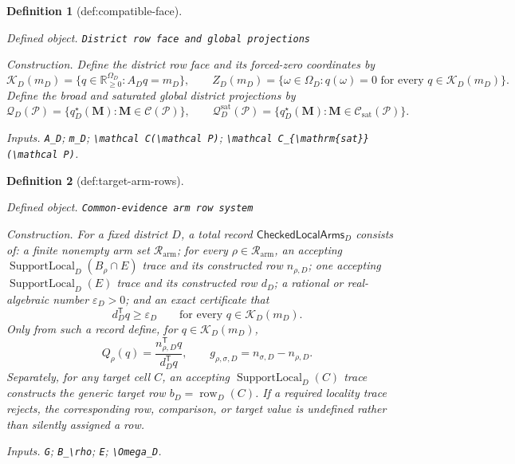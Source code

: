 \documentclass{article}
\newtheorem{definition}{Definition}
\begin{document}
\begin{definition}[def:compatible-face]\label{def:compatible-face}
\par\smallskip\noindent\emph{Defined object.} \texttt{District row face and global projections}
\par\smallskip\noindent\emph{Construction.} Define the district row face and its forced-zero coordinates by
\[
\mathcal K_D(m_D)=\{q\in\mathbb R_{\ge0}^{\Omega_D}:A_Dq=m_D\},
\qquad
Z_D(m_D)=\{\omega\in\Omega_D:q(\omega)=0\text{ for every }q\in\mathcal K_D(m_D)\}.
\]
Define the broad and saturated global district projections by
\[
\mathcal Q_D(\mathcal P)=\{q_D^\star(\mathbf M):\mathbf M\in\mathcal C(\mathcal P)\},
\qquad
\mathcal Q_D^{\mathrm{sat}}(\mathcal P)=\{q_D^\star(\mathbf M):\mathbf M\in\mathcal C_{\mathrm{sat}}(\mathcal P)\}.
\]
\par\smallskip\noindent\emph{Inputs.} \texttt{A\_\allowbreak{}D}; \texttt{m\_\allowbreak{}D}; \texttt{\textbackslash{}\allowbreak{}mathcal C(\textbackslash{}\allowbreak{}mathcal P)}; \texttt{\textbackslash{}\allowbreak{}mathcal C\_\allowbreak{}\{\textbackslash{}\allowbreak{}mathrm\{sat\}\allowbreak{}\}\allowbreak{}(\textbackslash{}\allowbreak{}mathcal P)}.
\end{definition}

\begin{definition}[def:target-arm-rows]\label{def:target-arm-rows}
\par\smallskip\noindent\emph{Defined object.} \texttt{Common-\allowbreak{}evidence arm row system}
\par\smallskip\noindent\emph{Construction.} For a fixed district \(D\), a total record \(\mathsf{CheckedLocalArms}_D\) consists of: a finite nonempty arm set \(\mathcal R_{\mathrm{arm}}\); for every \(\rho\in\mathcal R_{\mathrm{arm}}\), an accepting \(\operatorname{SupportLocal}_D(B_\rho\cap E)\) trace and its constructed row \(n_{\rho,D}\); one accepting \(\operatorname{SupportLocal}_D(E)\) trace and its constructed row \(d_D\); a rational or real-algebraic number \(\varepsilon_D>0\); and an exact certificate that
\[
d_D^{\mathsf T}q\geq\varepsilon_D
\qquad\text{for every }q\in\mathcal K_D(m_D).
\]
Only from such a record define, for \(q\in\mathcal K_D(m_D)\),
\[
Q_\rho(q)=\frac{n_{\rho,D}^{\mathsf T}q}{d_D^{\mathsf T}q},
\qquad
g_{\rho,\sigma,D}=n_{\sigma,D}-n_{\rho,D}.
\]
Separately, for any target cell \(C\), an accepting \(\operatorname{SupportLocal}_D(C)\) trace constructs the generic target row \(b_D=\operatorname{row}_D(C)\).  If a required locality trace rejects, the corresponding row, comparison, or target value is undefined rather than silently assigned a row.
\par\smallskip\noindent\emph{Inputs.} \texttt{G}; \texttt{B\_\allowbreak{}\textbackslash{}\allowbreak{}rho}; \texttt{E}; \texttt{\textbackslash{}\allowbreak{}Omega\_\allowbreak{}D}.
\end{definition}
\end{document}
